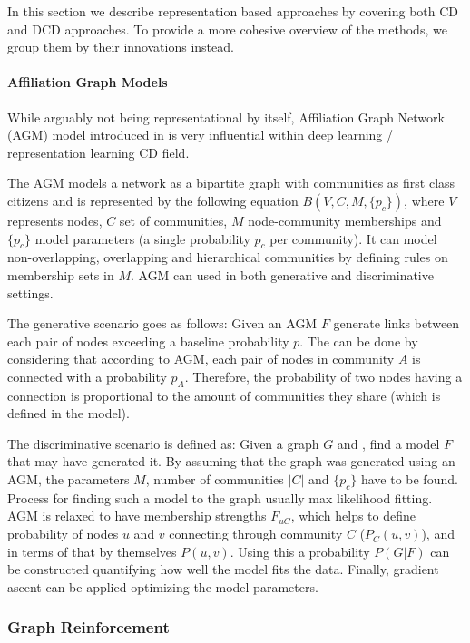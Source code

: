 \documentclass[
acmsmall,
nonacm,
screen,
acmthm]{../../scripts/pandoc/templates/acmart}
\begin{document}
In this section we describe representation based approaches by covering
both CD and DCD approaches. To provide a more cohesive overview of the
methods, we group them by their innovations instead.

\hypertarget{affiliation-graph-models}{%
\paragraph{Affiliation Graph Models}\label{affiliation-graph-models}}

While arguably not being representational by itself, Affiliation Graph
Network (AGM) model introduced in
\citet{yangCommunityAffiliationGraphModel2012} is very influential
within deep learning / representation learning CD field.

The AGM models a network as a bipartite graph with communities as first
class citizens and is represented by the following equation
\(B(V, C, M, \{p_c\})\), where \(V\) represents nodes, \(C\) set of
communities, \(M\) node-community memberships and \(\{p_c\}\) model
parameters (a single probability \(p_c\) per community). It can model
non-overlapping, overlapping and hierarchical communities by defining
rules on membership sets in \(M\). AGM can used in both generative and
discriminative settings.

The generative scenario goes as follows: Given an AGM \(F\) generate
links between each pair of nodes exceeding a baseline probability \(p\).
The can be done by considering that according to AGM, each pair of nodes
in community \(A\) is connected with a probability \(p_A\). Therefore,
the probability of two nodes having a connection is proportional to the
amount of communities they share (which is defined in the model).

The discriminative scenario is defined as: Given a graph \(G\) and ,
find a model \(F\) that may have generated it. By assuming that the
graph was generated using an AGM, the parameters \(M\), number of
communities \(|C|\) and \(\{p_c\}\) have to be found. Process for
finding such a model to the graph usually max likelihood fitting. AGM is
relaxed to have membership strengths \(F_{uC}\), which helps to define
probability of nodes \(u\) and \(v\) connecting through community \(C\)
(\(P_{C}(u, v)\)), and in terms of that by themselves \(P(u, v)\). Using
this a probability \(P(G|F)\) can be constructed quantifying how well
the model fits the data. Finally, gradient ascent can be applied
optimizing the model parameters.

\hypertarget{graph-reinforcement}{%
\subsubsection{Graph Reinforcement}\label{graph-reinforcement}}
\end{document}
